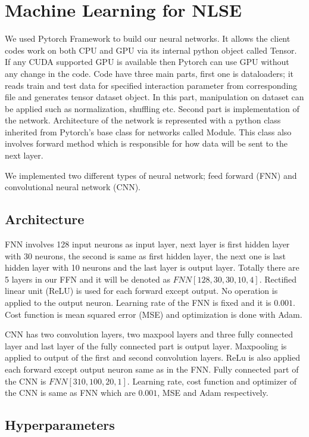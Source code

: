 \documentclass[a4paper,times,12pt]{article}
\begin{document}
\section{Machine Learning for NLSE}

We used Pytorch Framework to build our neural networks. It allows the client codes work on both CPU and GPU via its internal python object called Tensor. If any CUDA supported GPU is available then Pytorch can use GPU without any change in the code. Code have three main parts, first one is dataloaders; it reads train and test data for specified interaction parameter from corresponding file and generates tensor dataset object. In this part, manipulation on dataset can be applied such as normalization, shuffling etc. Second part is implementation of the network. Architecture of the network is represented with a python class inherited from Pytorch's base class for networks called Module. This class also involves forward method which is responsible for how data will be sent to the next layer. 


We implemented two different types of neural network; feed forward (FNN) and convolutional neural network (CNN).


\subsection{Architecture}

FNN involves 128 input neurons as input layer, next layer is first hidden layer with 30 neurons, the second is same as first hidden layer, the next one is last hidden layer with 10 neurons and the last layer is output layer. Totally there are 5 layers in our FFN and it will be denoted as $FNN[128, 30, 30, 10, 4]$. Rectified linear unit (ReLU) is used for each forward except output. No operation is applied to the output neuron. Learning rate of the FNN is fixed and it is $0.001$. Cost function is mean squared error (MSE) and optimization is done with Adam. 


CNN has two convolution layers, two maxpool layers and three fully connected layer and last layer of the fully connected part is output layer. Maxpooling is applied to output of the first and second convolution layers. ReLu is also applied each forward except output neuron same as in the FNN. Fully connected part of the CNN is $FNN[310, 100, 20, 1]$. Learning rate, cost function and optimizer of the CNN is same as FNN which are $0.001$, MSE and Adam respectively.


\subsection{Hyperparameters}
\end{document}
